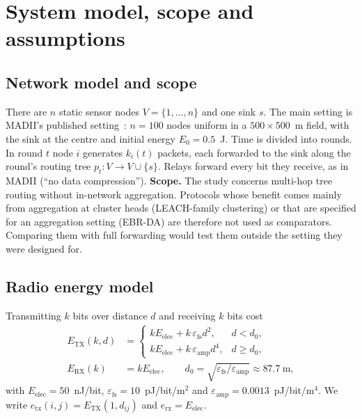 \section{System model, scope and assumptions}\label{sec:model}

\subsection{Network model and scope}\label{sec:scope}
There are $n$ static sensor nodes $V=\{1,\dots,n\}$ and one sink $s$. The main setting is MADII's published setting~\cite{yang2025madii}: $n=100$ nodes uniform in a $500\times500$~m field, with the sink at the centre and initial energy $E_0=0.5$~J. Time is divided into rounds. In round $t$ node $i$ generates $k_i(t)$ packets, each forwarded to the sink along the round's routing tree $p_t:V\to V\cup\{s\}$. Relays forward every bit they receive, as in MADII (``no data compression''). \textbf{Scope.} The study concerns multi-hop tree routing without in-network aggregation. Protocols whose benefit comes mainly from aggregation at cluster heads (LEACH-family clustering) or that are specified for an aggregation setting (EBR-DA) are therefore not used as comparators. Comparing them with full forwarding would test them outside the setting they were designed for.

\subsection{Radio energy model}\label{sec:radio}
Transmitting $k$ bits over distance $d$ and receiving $k$ bits cost
\begin{align}
E_{\mathrm{TX}}(k,d) &= \begin{cases} kE_{\mathrm{elec}} + k\,\varepsilon_{\mathrm{fs}}d^2, & d<d_0,\\ kE_{\mathrm{elec}} + k\,\varepsilon_{\mathrm{amp}}d^4, & d\ge d_0,\end{cases}\label{eq:tx}\\
E_{\mathrm{RX}}(k) &= kE_{\mathrm{elec}},\qquad d_0=\sqrt{\varepsilon_{\mathrm{fs}}/\varepsilon_{\mathrm{amp}}}\approx 87.7~\mathrm{m},\label{eq:rx}
\end{align}
with $E_{\mathrm{elec}}=50$~nJ/bit, $\varepsilon_{\mathrm{fs}}=10$~pJ/bit/m$^2$ and $\varepsilon_{\mathrm{amp}}=0.0013$~pJ/bit/m$^4$. We write $e_{\mathrm{tx}}(i,j)=E_{\mathrm{TX}}(1,d_{ij})$ and $e_{\mathrm{rx}}=E_{\mathrm{elec}}$.

